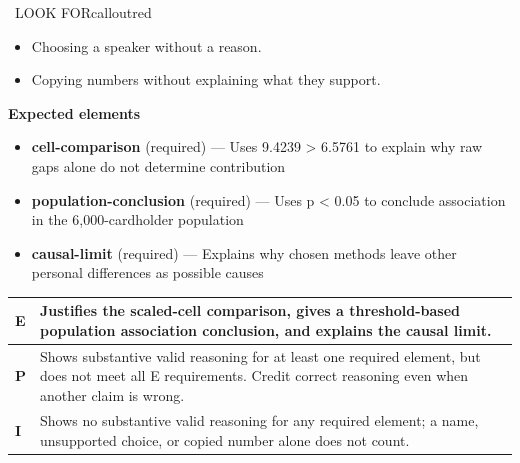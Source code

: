 \documentclass[11pt]{article}
\begin{document}
\begin{callout}{\IconWarn\ LOOK FOR}{calloutred}
\begin{itemize}[leftmargin=1.5em,itemsep=2pt,topsep=2pt]
  \item Choosing a speaker without a reason.
  \item Copying numbers without explaining what they support.
\end{itemize}
\end{callout}


\textbf{Expected elements}
\begin{itemize}[leftmargin=1.5em,itemsep=2pt,topsep=2pt]
  \item \textbf{cell-comparison} (required) --- Uses 9.4239 > 6.5761 to explain why raw gaps alone do not determine contribution
  \item \textbf{population-conclusion} (required) --- Uses p < 0.05 to conclude association in the 6,000-cardholder population
  \item \textbf{causal-limit} (required) --- Explains why chosen methods leave other personal differences as possible causes
\end{itemize}

{\small\renewcommand{\arraystretch}{1.25}
\noindent\begin{tabular}{|p{0.5in}|p{5.9in}|}
\hline
\textbf{E} & Justifies the scaled-cell comparison, gives a threshold-based population association conclusion, and explains the causal limit. \\ \hline
\textbf{P} & Shows substantive valid reasoning for at least one required element, but does not meet all E requirements. Credit correct reasoning even when another claim is wrong. \\ \hline
\textbf{I} & Shows no substantive valid reasoning for any required element; a name, unsupported choice, or copied number alone does not count. \\ \hline
\end{tabular}}

\clearpage
{}
\end{document}
